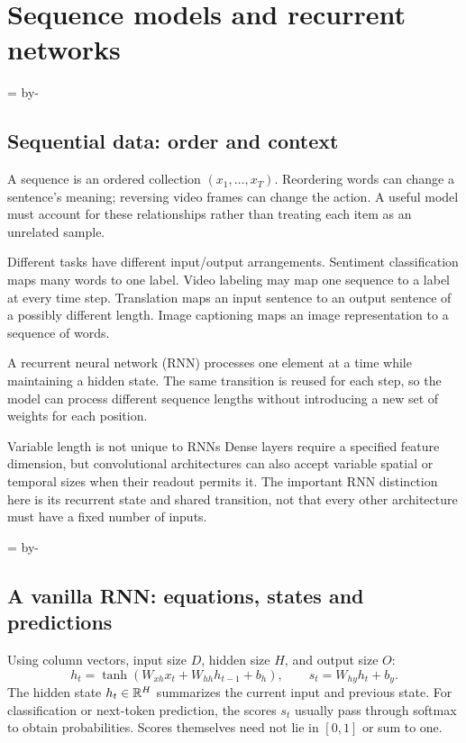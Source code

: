 \documentclass[11pt]{article}
\newcommand{\newsubsection}[1]{\par\begingroup\skip0=\pagegoal\advance\skip0 by-\pagetotal\ifdim\skip0<12\baselineskip\newpage\fi\endgroup\subsection{#1}}
\begin{document}
\tableofcontents\clearpage


\clearpage
\section{Sequence models and recurrent networks}

\newsubsection{Sequential data: order and context}
A sequence is an ordered collection $(x_1,\ldots,x_T)$. Reordering words can change a sentence's meaning; reversing video frames can change the action. A useful model must account for these relationships rather than treating each item as an unrelated sample.

Different tasks have different input/output arrangements. Sentiment classification maps many words to one label. Video labeling may map one sequence to a label at every time step. Translation maps an input sentence to an output sentence of a possibly different length. Image captioning maps an image representation to a sequence of words.

A recurrent neural network (RNN) processes one element at a time while maintaining a hidden state. The same transition is reused for each step, so the model can process different sequence lengths without introducing a new set of weights for each position.
\begin{careful}{Variable length is not unique to RNNs}
Dense layers require a specified feature dimension, but convolutional architectures can also accept variable spatial or temporal sizes when their readout permits it. The important RNN distinction here is its recurrent state and shared transition, not that every other architecture must have a fixed number of inputs.
\end{careful}

\newsubsection{A vanilla RNN: equations, states and predictions}
Using column vectors, input size $D$, hidden size $H$, and output size $O$:
\[
h_t=\tanh(W_{xh}x_t+W_{hh}h_{t-1}+b_h),\qquad
s_t=W_{hy}h_t+b_y.
\]
The hidden state $h_t\in\mathbb{R}^H$ summarizes the current input and previous state. For classification or next-token prediction, the scores $s_t$ usually pass through softmax to obtain probabilities. Scores themselves need not lie in $[0,1]$ or sum to one.
\end{document}
